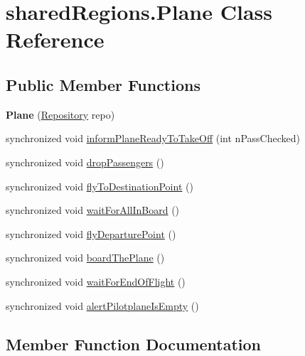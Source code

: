 \hypertarget{classshared_regions_1_1_plane}{}\section{shared\+Regions.\+Plane Class Reference}
\label{classshared_regions_1_1_plane}
\subsection*{Public Member Functions}
\begin{DoxyCompactItemize}
\item 
\mbox{\label{classshared_regions_1_1_plane_a37fe2efb3bdf4e0287cbb795aedaff24}} 
{\bfseries Plane} (\hyperlink{classshared_regions_1_1_repository}{Repository} repo)
\item 
synchronized void \hyperlink{classshared_regions_1_1_plane_adee39c6d4cc4151349e9b3f9dd9c8f9e}{inform\+Plane\+Ready\+To\+Take\+Off} (int n\+Pass\+Checked)
\item 
synchronized void \hyperlink{classshared_regions_1_1_plane_a2a149380a2b96b06d85d84b4b7490068}{drop\+Passengers} ()
\item 
synchronized void \hyperlink{classshared_regions_1_1_plane_a14092728e37c693cce80f31c0096e467}{fly\+To\+Destination\+Point} ()
\item 
synchronized void \hyperlink{classshared_regions_1_1_plane_a8520969010cb85cbff07deb3f1a0f003}{wait\+For\+All\+In\+Board} ()
\item 
synchronized void \hyperlink{classshared_regions_1_1_plane_aa6a53f1bb5882641937018e78100272f}{fly\+Departure\+Point} ()
\item 
synchronized void \hyperlink{classshared_regions_1_1_plane_a900b3a6f9a7ab1a5111a71175c6ed991}{board\+The\+Plane} ()
\item 
synchronized void \hyperlink{classshared_regions_1_1_plane_a5a0b3cd50c5832849185293e70d9725b}{wait\+For\+End\+Of\+Flight} ()
\item 
synchronized void \hyperlink{classshared_regions_1_1_plane_a86935f69418facbb8f40c742d93195c9}{alert\+Pilotplane\+Is\+Empty} ()
\end{DoxyCompactItemize}


\subsection{Member Function Documentation}
\mbox{\label{classshared_regions_1_1_plane_a86935f69418facbb8f40c742d93195c9}} 
